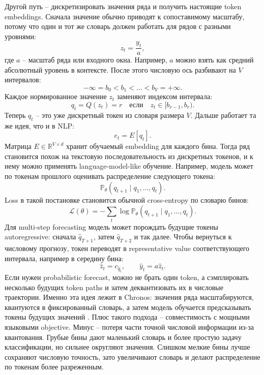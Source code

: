 \documentclass[12pt,fleqn]{article}
\begin{document}
Другой путь -- дискретизировать значения ряда и получить настоящие token embeddings.
Сначала значение обычно приводят к сопоставимому масштабу, потому что один и тот же словарь должен работать для рядов с разными уровнями:
\begin{equation}
  z_t = \frac{y_t}{a},
\end{equation}
где $a$ -- масштаб ряда или входного окна.
Например, $a$ можно взять как средний абсолютный уровень в контексте.
После этого числовую ось разбивают на $V$ интервалов:
\begin{equation}
  -\infty = b_0 < b_1 < \ldots < b_V = +\infty.
\end{equation}
Каждое нормированное значение $z_t$ заменяют индексом интервала:
\begin{equation}
  q_t = Q(z_t) = r
  \quad \text{если} \quad
  z_t \in [b_{r-1}, b_r).
\end{equation}
Теперь $q_t$ -- это уже дискретный токен из словаря размера $V$.
Дальше работает та же идея, что и в NLP:
\begin{equation}
  e_t = E[q_t].
\end{equation}
Матрица $E \in \mathbb{R}^{V \times d}$ хранит обучаемый embedding для каждого бина.
Тогда ряд становится похож на текстовую последовательность из дискретных токенов, и к нему можно применять language-model-like обучение.
Например, модель может по токенам прошлого оценивать распределение следующего токена:
\begin{equation}
  \mathbb{P}_\theta(q_{t+1} \mid q_1, \ldots, q_t).
\end{equation}
Loss в такой постановке становится обычной cross-entropy по словарю бинов:
\begin{equation}
  \mathcal{L}(\theta)
  =
  -\sum_t \log \mathbb{P}_\theta(q_{t+1} \mid q_1, \ldots, q_t).
\end{equation}
Для multi-step forecasting модель может порождать будущие токены autoregressive: сначала $\hat q_{T+1}$, затем $\hat q_{T+2}$ и так далее.
Чтобы вернуться к числовому прогнозу, токен переводят в representative value соответствующего интервала, например в середину бина:
\begin{equation}
  \hat z_t = c_{\hat q_t},
  \qquad
  \hat y_t = a \hat z_t.
\end{equation}
Если нужен probabilistic forecast, можно не брать один token, а сэмплировать несколько будущих token paths и затем деквантизовать их в числовые траектории.
Именно эта идея лежит в Chronos: значения ряда масштабируются, квантуются в фиксированный словарь, а затем модель обучается предсказывать токены будущих значений \cite{ansari2024chronos}.
Плюс такого подхода -- совместимость с мощными языковыми objective.
Минус -- потеря части точной числовой информации из-за квантования.
Грубые бины дают маленький словарь и более простую задачу классификации, но сильнее округляют значения.
Слишком мелкие бины лучше сохраняют числовую точность, зато увеличивают словарь и делают распределение по токенам более разреженным.
\end{document}
